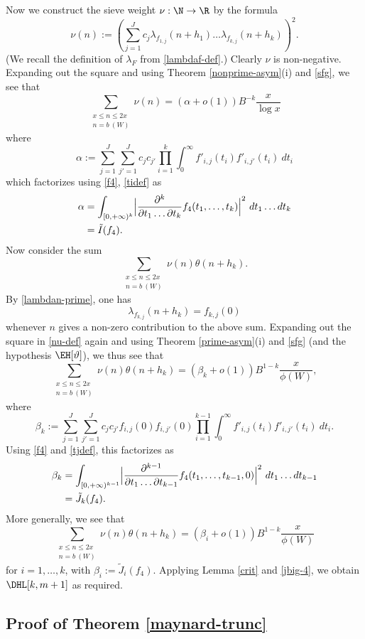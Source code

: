 Now we construct the sieve weight $\nu: \N \to \R$ by the formula
\begin{equation}\label{nu-def}
 \nu(n) := \left( \sum_{j=1}^J c_j \lambda_{f_{1,j}}(n+h_1) \dots \lambda_{f_{k,j}}(n+h_k) \right)^2.
\end{equation}
(We recall the definition of $\lambda_F$ from \eqref{lambdaf-def}.) Clearly $\nu$ is non-negative.  Expanding out the square and using Theorem \ref{nonprime-asym}(i) and \eqref{sfg}, we see that
$$ \sum_{\substack{x \leq n \leq 2x\\ n = b\ (W)}} \nu(n) = (\alpha + o(1)) B^{-k} \frac{x}{\log x}$$
where
$$ \alpha := \sum_{j=1}^J \sum_{j'=1}^J c_j c_{j'} \prod_{i=1}^k \int_0^\infty f'_{i,j}(t_i) f'_{i,j'}(t_i)\ dt_i$$
which factorizes using \eqref{f4}, \eqref{tidef} as
\begin{align*}
\alpha &= \int_{[0,+\infty)^k} \Bigl|\frac{\partial^k}{\partial t_1 \dots \partial t_k} f_4(t_1,\dots,t_k)\Bigr|^2\ dt_1 \dots dt_k \\
&= \tilde I(f_4).
\end{align*}
Now consider the sum
$$ \sum_{\substack{x \leq n \leq 2x\\ n = b\ (W)}} \nu(n) \theta(n+h_k).$$
By \eqref{lambdan-prime}, one has
$$ \lambda_{f_{k,j}}(n+h_k) = f_{k,j}(0)$$
whenever $n$ gives a non-zero contribution to the above sum.  Expanding out the square in \eqref{nu-def} again and using Theorem \ref{prime-asym}(i) and \eqref{sfg} (and the hypothesis $\EH[\vartheta]$), we thus see that
$$ \sum_{\substack{x \leq n \leq 2x\\ n = b\ (W)}} \nu(n) \theta(n+h_k) = (\beta_k + o(1)) B^{1-k} \frac{x}{\phi(W)}, $$
where
$$ \beta_k := \sum_{j=1}^J \sum_{j'=1}^J c_j c_{j'} f_{i,j}(0) f_{i,j'}(0) \prod_{i=1}^{k-1} \int_0^\infty f'_{i,j}(t_i) f'_{i,j'}(t_i)\ dt_i.$$
Using \eqref{f4} and \eqref{tjdef}, this factorizes as
\begin{align*}
\beta_k &= \int_{[0,+\infty)^{k-1}} \Bigl|\frac{\partial^{k-1}}{\partial t_1 \dots \partial t_{k-1}} f_4(t_1,\dots,t_{k-1},0)\Bigr|^2\ dt_1 \dots dt_{k-1} \\
&= \tilde J_k(f_4).
\end{align*}
More generally, we see that
$$ \sum_{\substack{x \leq n \leq 2x\\ n = b\ (W)}} \nu(n) \theta(n+h_k) = (\beta_i + o(1)) B^{1-k} \frac{x}{\phi(W)}$$
for $i=1,\dots,k$, with $\beta_i := \tilde J_i(f_4)$.  Applying Lemma \ref{crit} and \eqref{jbig-4}, we obtain $\DHL[k,m+1]$ as required.

\subsection{Proof of Theorem \ref{maynard-trunc}}\label{trunc-sec}

